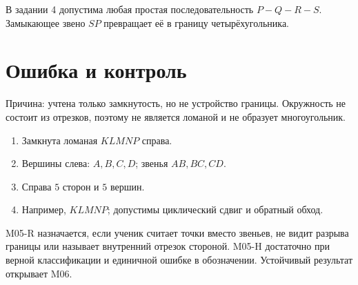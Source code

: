 \begin{teacherbox}[К построению]
  В задании 4 допустима любая простая последовательность $P-Q-R-S$.
  Замыкающее звено $SP$ превращает её в границу четырёхугольника.
\end{teacherbox}

\section{Ошибка и контроль}

\begin{warningbox}
  Причина: учтена только замкнутость, но не устройство границы. Окружность
  не состоит из отрезков, поэтому не является ломаной и не образует
  многоугольник.
\end{warningbox}

\openclosedfigure

\begin{checkpointbox}[Ответы]
  \begin{enumerate}[label=\textbf{\arabic*.}]
    \item Замкнута ломаная $KLMNP$ справа.
    \item Вершины слева: $A,B,C,D$; звенья $AB,BC,CD$.
    \item Справа $5$ сторон и $5$ вершин.
    \item Например, $KLMNP$; допустимы циклический сдвиг и обратный обход.
  \end{enumerate}
\end{checkpointbox}

\begin{teacherbox}
  M05-R назначается, если ученик считает точки вместо звеньев, не видит
  разрыва границы или называет внутренний отрезок стороной. M05-H достаточно
  при верной классификации и единичной ошибке в обозначении. Устойчивый
  результат открывает M06.
\end{teacherbox}
